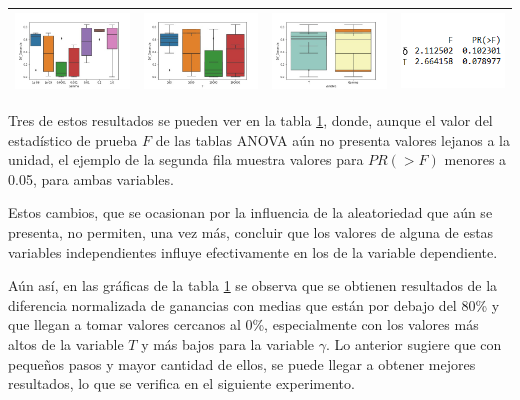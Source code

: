\begin{table}[H]
\begin{tabular}[c]{llll}
\multicolumn{1}{|l|}{\includegraphics[align=t, width=33mm]{cajasGamma_exp33.jpg}}    & \multicolumn{1}{l|}{\includegraphics[align=t, width=33mm]{cajasT_exp33.jpg} } & \multicolumn{1}{l|}{\includegraphics[align=t, width=33mm]{cajasT_Gamma_exp33.jpg} } & \multicolumn{1}{p{3cm}|}{\includegraphics[align=t, width=30mm]{Anova33.png}} \\ \hline
\end{tabular}
\label{exp3}
\end{table}

Tres de estos resultados se pueden ver en la tabla \ref{exp3}, donde, aunque el valor del estadístico de prueba $F$ de las tablas ANOVA aún no presenta valores lejanos a la unidad, el ejemplo de la segunda fila muestra valores para $PR(>F)$ menores a 0.05, para ambas variables. 
 
Estos cambios, que se ocasionan por la influencia de la aleatoriedad que aún se presenta, no permiten, una vez más, concluir que los valores de alguna de estas variables independientes influye efectivamente en los de la variable dependiente. 
 
Aún así, en las gráficas de la tabla \ref{exp3} se observa que se obtienen resultados de la diferencia normalizada de ganancias con medias que están por debajo del 80\% y que llegan a tomar valores cercanos al 0\%, especialmente con los valores más altos de la variable $T$ y más bajos para la variable $\gamma$. Lo anterior sugiere que con pequeños pasos y mayor cantidad de ellos, se puede llegar a obtener mejores resultados, lo que se verifica en el siguiente experimento.

